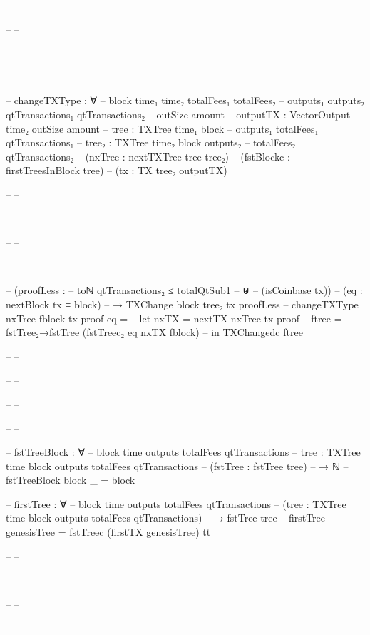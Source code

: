 \documentclass{beamer}
\begin{document}
{\begin{frame}
\begin{code}
-- -- \end{code}
-- -- \end{frame}
-- -- \begin{frame}
-- -- \begin{code}


--       changeTXType : ∀
--         {block time₁ time₂ totalFees₁ totalFees₂
--           outputs₁ outputs₂ qtTransactions₁ qtTransactions₂
--         outSize amount}
--         {outputTX : VectorOutput time₂ outSize amount}
--         {tree : TXTree time₁ block
--           outputs₁ totalFees₁ qtTransactions₁}
--         {tree₂ : TXTree time₂ block outputs₂
--           totalFees₂ qtTransactions₂}
--         (nxTree : nextTXTree tree tree₂)
--         (fstBlockc : firstTreesInBlock tree)
--         (tx : TX tree₂ outputTX)

-- -- \end{code}
-- -- \end{frame}
-- -- \begin{frame}
-- -- \begin{code}

--         (proofLess :
--           toℕ qtTransactions₂ ≤ totalQtSub1
--           ⊎
--           (isCoinbase tx))
--         (eq : nextBlock tx ≡ block)
--         → TXChange {block} tree₂ tx proofLess
--       changeTXType nxTree fblock tx proof eq =
--         let nxTX = nextTX nxTree tx proof
--             ftree = fstTree₂→fstTree (fstTreec₂ eq nxTX fblock)
--         in TXChangedc ftree

-- -- \end{code}
-- -- \end{frame}
-- -- \begin{frame}
-- -- \begin{code}


--       fstTreeBlock : ∀
--         {block time outputs totalFees qtTransactions}
--         {tree : TXTree time block outputs totalFees qtTransactions}
--         (fstTree : fstTree tree)
--         → ℕ
--       fstTreeBlock {block} _ = block

--       firstTree : ∀
--         {block time outputs totalFees qtTransactions}
--         (tree : TXTree time block outputs totalFees qtTransactions)
--         → fstTree tree
--       firstTree genesisTree = fstTreec (firstTX genesisTree) tt

-- -- \end{code}
-- -- \end{frame}
-- -- \begin{frame}
-- -- \begin{code}


\end{code}
\end{frame}}
\end{document}
